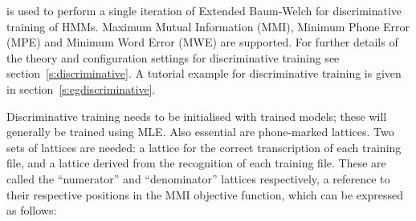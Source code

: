 %

%

\newpage
{}



 is used to perform a single iteration of Extended Baum-Welch
for discriminative training of HMMs.  Maximum Mutual Information (MMI),
Minimum Phone Error (MPE) and  Minimum Word Error (MWE) are supported.
For further details of the theory and configuration settings for
discriminative training see section~\ref{s:discriminative}. A tutorial example
for discriminative training is given in section~\ref{s:egdiscriminative}.

Discriminative training needs to be initialised with trained models; these
will generally be trained using MLE.  Also essential are phone-marked lattices.
Two sets of lattices are needed: a lattice for the correct transcription of
each training file, and a lattice derived from the recognition of each
training file.  These are called the ``numerator'' and ``denominator''
lattices respectively, a reference to their respective positions in the
MMI objective function, which can be expressed as follows:

